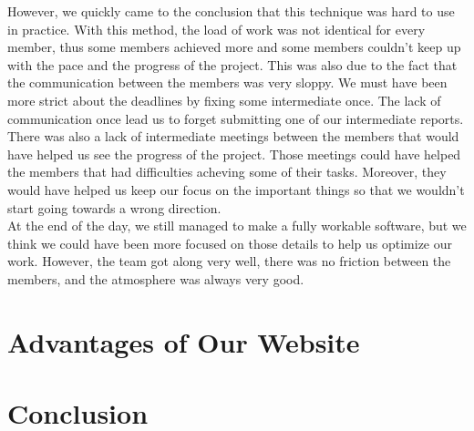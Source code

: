 \documentclass[a4paper, 12pt]{article}
\begin{document}
However, we quickly came to the conclusion that this technique was hard to use in practice. With this method, the load of work was not identical for every member, thus some members achieved more and some members couldn't keep up with the pace and the progress of the project. This was also due to the fact that the communication between the members was very sloppy. We must have been more strict about the deadlines by fixing some intermediate once. The lack of communication once lead us to forget submitting one of our intermediate reports.\\

There was also a lack of intermediate meetings between the members that would have helped us see the progress of the project. Those meetings could have helped the members that had difficulties acheving some of their tasks. Moreover, they would have helped us keep our focus on the important things so that we wouldn't start going towards a wrong direction. \\

At the end of the day, we still managed to make a fully workable software, but we think we could have been more focused on those details to help us optimize our work. However, the team got along very well, there was no friction between the members, and the atmosphere was always very good.\\

\section{Advantages of Our Website}

\section{Conclusion}
\end{document}
